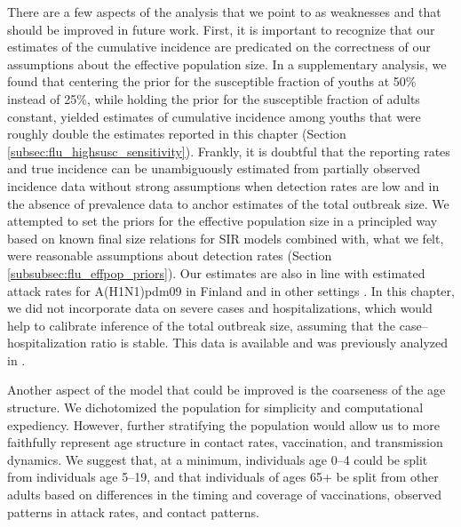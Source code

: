There are a few aspects of the analysis that we point to as weaknesses and that should be improved in future work. First, it is important to recognize that our estimates of the cumulative incidence are predicated on the correctness of our assumptions about the effective population size. In a supplementary analysis, we found that centering the prior for the susceptible fraction of youths at 50\% instead of 25\%, while holding the prior for the susceptible fraction of adults constant, yielded estimates of cumulative incidence among youths that were roughly double the estimates reported in this chapter (Section \ref{subsec:flu_highsusc_sensitivity}). Frankly, it is doubtful that the reporting rates and true incidence can be unambiguously estimated from partially observed incidence data without strong assumptions when detection rates are low and in the absence of prevalence data to anchor estimates of the total outbreak size. We attempted to set the priors for the effective population size in a principled way based on known final size relations for SIR models combined with, what we felt, were reasonable assumptions about detection rates (Section \ref{subsubsec:flu_effpop_priors}). Our estimates are also in line with estimated attack rates for A(H1N1)pdm09 in Finland \cite{cuesta2016pandemic,shubin2014estimating,shubin2014estimating} and in other settings \cite{dawood2012estimated,opatowski2011transmission}. In this chapter, we did not incorporate data on severe cases and hospitalizations, which would help to calibrate inference of the total outbreak size, assuming that the case--hospitalization ratio is stable. This data is available and was previously analyzed in \cite{shubin2016revealing}. 
 
Another aspect of the model that could be improved is the coarseness of the age structure. We dichotomized the population for simplicity and computational expediency. However, further stratifying the population would allow us to more faithfully represent age structure in contact rates, vaccination, and transmission dynamics. We suggest that, at a minimum, individuals age 0--4 could be split from individuals age 5--19, and that individuals of ages 65+ be split from other adults based on differences in the timing and coverage of vaccinations, observed patterns in attack rates, and contact patterns. 